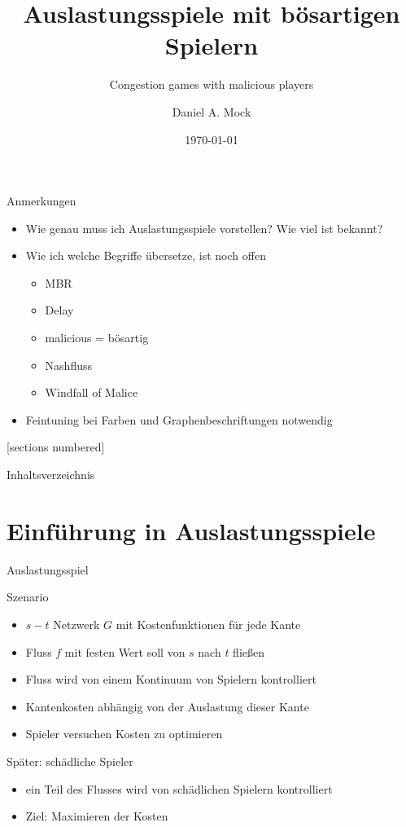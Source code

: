 \documentclass{beamer}
\title{Auslastungsspiele mit bösartigen Spielern}
\subtitle{Congestion games with malicious players}
\date{\today}
\author{Daniel A. Mock}
\institute{Lehrstuhl i1 -- RWTH Aachen}
\begin{document}
\begin{frame}{Anmerkungen}
	\begin{itemize}
		\item Wie genau muss ich Auslastungsspiele vorstellen? Wie viel ist bekannt?
		\item Wie ich welche Begriffe übersetze, ist noch offen
		\begin{itemize}
			\item MBR
			\item Delay
			\item malicious = bösartig
			\item Nashfluss
			\item Windfall of Malice
		\end{itemize}
		\item Feintuning bei Farben und Graphenbeschriftungen notwendig
	\end{itemize}
\end{frame}

\maketitle

[sections numbered]

\begin{frame}{Inhaltsverzeichnis}
	\tableofcontents
\end{frame}


\section{Einführung in Auslastungsspiele}
\begin{frame}{Auslastungsspiel}
	\begin{block}{Szenario}
		\begin{itemize}
			\item $s-t$ Netzwerk $G$ mit Kostenfunktionen für jede Kante
			\item Fluss $f$ mit festen Wert soll von $s$ nach $t$ fließen
			\item Fluss wird von einem Kontinuum von Spielern kontrolliert
			\item Kantenkosten abhängig von der Auslastung dieser Kante
			\item Spieler versuchen Kosten zu optimieren
		\end{itemize}
	\end{block}

	\begin{block}{Später: schädliche Spieler}
		\begin{itemize}
			\item ein Teil des Flusses wird von schädlichen Spielern kontrolliert
			\item Ziel: Maximieren der Kosten
		\end{itemize}
	\end{block}
\end{frame}
\end{document}
